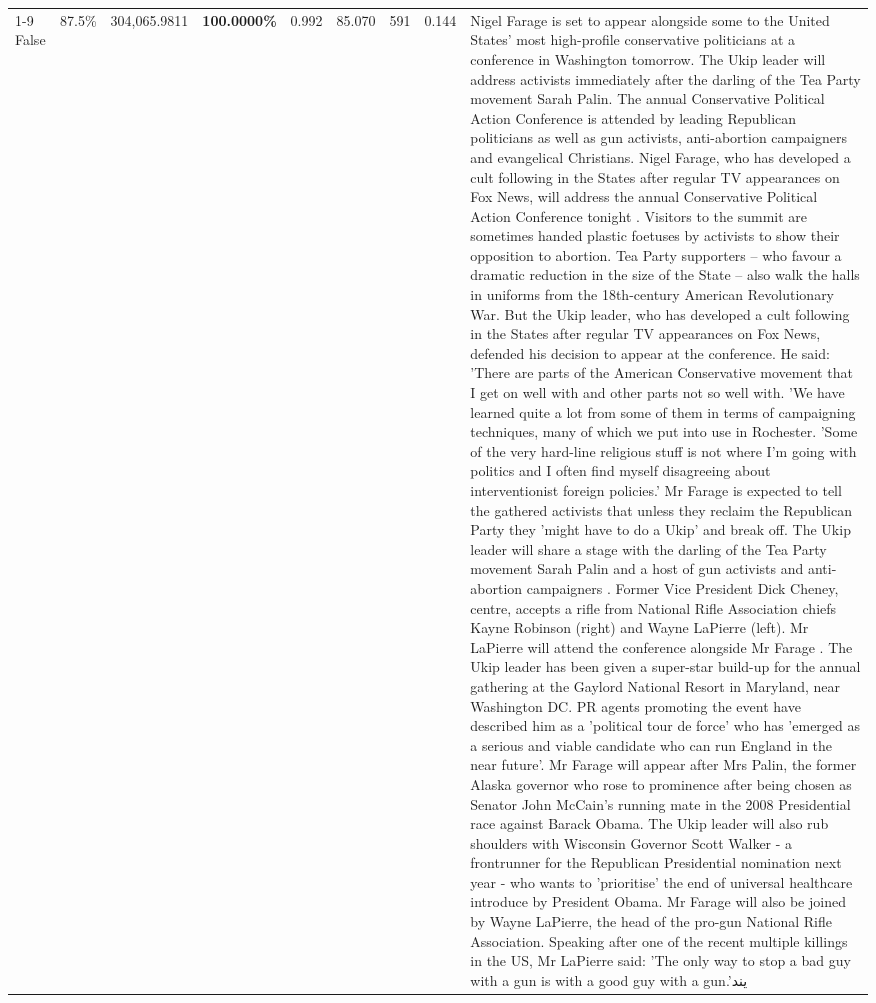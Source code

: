 \begin{table}[H]
\begin{tabular}{lllrlllll}
\cline{1-9} \cline{2-9}
False & 87.5\% & \color{red} 304,065.9811 & \bfseries \color{red} 100.0000\% & 0.992 & 85.070 & 591 & 0.144 & Nigel Farage is set to appear alongside some to the United States' most high-profile conservative politicians at a conference in Washington tomorrow. The Ukip leader will address activists immediately after the darling of the Tea Party movement Sarah Palin. The annual Conservative Political Action Conference is attended by leading Republican politicians as well as gun activists, anti-abortion campaigners and evangelical Christians. Nigel Farage, who has developed a cult following in the States after regular TV appearances on Fox News, will address the annual Conservative Political Action Conference tonight . Visitors to the summit are sometimes handed plastic foetuses by activists to show their opposition to abortion. Tea Party supporters – who favour a dramatic reduction in the size of the State – also walk the halls in uniforms from the 18th-century American Revolutionary War. But the Ukip leader, who has developed a cult following in the States after regular TV appearances on Fox News, defended his decision to appear at the conference. He said: 'There are parts of the American Conservative movement that I get on well with and other parts not so well with. 'We have learned quite a lot from some of them in terms of campaigning techniques, many of which we put into use in Rochester. 'Some of the very hard-line religious stuff is not where I'm going with politics and I often find myself disagreeing about interventionist foreign policies.' Mr Farage is expected to tell the gathered activists that unless they reclaim the Republican Party they 'might have to do a Ukip' and break off. The Ukip leader will share a stage with the darling of the Tea Party movement Sarah Palin and a host of gun activists and anti-abortion campaigners . Former Vice President Dick Cheney, centre, accepts a rifle from National Rifle Association chiefs Kayne Robinson (right) and Wayne LaPierre (left). Mr LaPierre will attend the conference alongside Mr Farage . The Ukip leader has been given a super-star build-up for the annual gathering at the Gaylord National Resort in Maryland, near Washington DC. PR agents promoting the event have described him as a 'political tour de force' who has 'emerged as a serious and viable candidate who can run England in the near future'. Mr Farage will appear after Mrs Palin, the former Alaska governor who rose to prominence after being chosen as Senator John McCain's running mate in the 2008 Presidential race against Barack Obama. The Ukip leader will also rub shoulders with Wisconsin Governor Scott Walker - a frontrunner for the Republican Presidential nomination next year - who wants to 'prioritise' the end of universal healthcare introduce by President Obama. Mr Farage will also be joined by Wayne LaPierre, the head of the pro-gun National Rifle Association. Speaking after one of the recent multiple killings in the US, Mr LaPierre said: 'The only way to stop a bad guy with a gun is with a good guy with a gun.'يند \\

\end{tabular}
\end{table}
